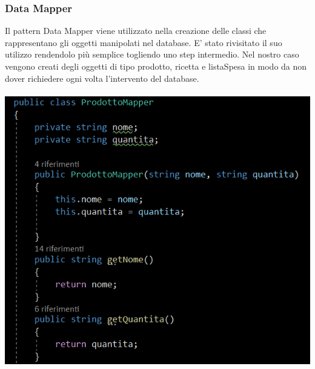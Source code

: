 \documentclass[a4paper, titlepage]{article}
\begin{document}
\subsubsection{Data Mapper}
Il pattern Data Mapper viene utilizzato nella creazione delle classi che rappresentano gli oggetti manipolati nel database.
E' stato rivisitato il suo utilizzo rendendolo più semplice togliendo uno step intermedio.
Nel nostro caso vengono creati degli oggetti di tipo prodotto, ricetta e listaSpesa in modo da non dover richiedere ogni volta l'intervento del database.\\\\
\includegraphics[scale=0.70]{Immagini/DataMapper.PNG}
\newpage
\end{document}
